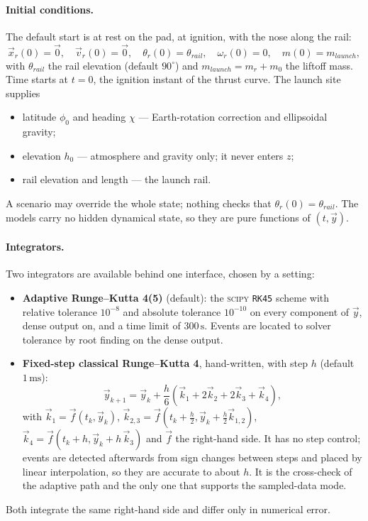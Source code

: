 \paragraph{Initial conditions.} The default start is at rest on the pad, at ignition, with the nose
along the rail:
\begin{equation} \label{eq:initial_conditions}
    \vec{x}_r(0)=\vec{0}, \quad \vec{v}_r(0)=\vec{0}, \quad
    \theta_r(0)=\theta_{rail}, \quad \omega_r(0)=0, \quad m(0)=m_{launch},
\end{equation}
with $\theta_{rail}$ the rail elevation (default $90^\circ$) and $m_{launch}=m_r+m_0$ the liftoff
mass. Time starts at $t=0$, the ignition instant of the thrust curve. The launch site supplies
\begin{itemize}
    \item latitude $\phi_0$ and heading $\chi$ --- Earth-rotation correction and ellipsoidal gravity;
    \item elevation $h_0$ --- atmosphere and gravity only; it never enters $z$;
    \item rail elevation and length --- the launch rail.
\end{itemize}
A scenario may override the whole state; nothing checks that $\theta_r(0)=\theta_{rail}$. The
models carry no hidden dynamical state, so they are pure functions of $(t,\vec{y})$.

\paragraph{Integrators.} Two integrators are available behind one interface, chosen by a setting:
\begin{itemize}
    \item \textbf{Adaptive Runge--Kutta 4(5)} (default): the \textsc{scipy} \texttt{RK45} scheme
    with relative tolerance $10^{-8}$ and absolute tolerance $10^{-10}$ on every component of
    $\vec{y}$, dense output on, and a time limit of $300\,\mathrm{s}$. Events are located to solver
    tolerance by root finding on the dense output.
    \item \textbf{Fixed-step classical Runge--Kutta 4}, hand-written, with step $h$ (default
    $1\,\mathrm{ms}$):
    \begin{equation} \label{eq:rk4}
        \vec{y}_{k+1}=\vec{y}_k+\frac{h}{6}\left(\vec{k}_1+2\vec{k}_2+2\vec{k}_3+\vec{k}_4\right),
    \end{equation}
    with $\vec{k}_1=\vec{f}(t_k,\vec{y}_k)$, $\vec{k}_{2,3}=\vec{f}\!\left(t_k+\tfrac{h}{2},
    \vec{y}_k+\tfrac{h}{2}\vec{k}_{1,2}\right)$, $\vec{k}_4=\vec{f}(t_k+h,
    \vec{y}_k+h\,\vec{k}_3)$ and $\vec{f}$ the right-hand side. It has no step control; events are
    detected afterwards from sign changes between steps and placed by linear interpolation, so they
    are accurate to about $h$. It is the cross-check of the adaptive path and the only one that
    supports the sampled-data mode.
\end{itemize}
Both integrate the same right-hand side and differ only in numerical error.

